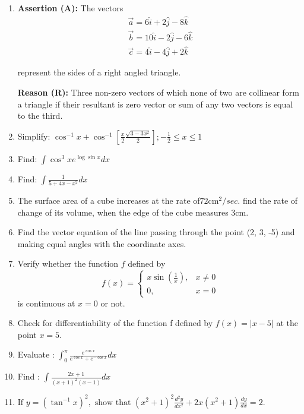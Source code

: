 \documentclass{article}
\providecommand{\brak}[1]{\ensuremath{\left(#1\right)}}
\begin{document}
\begin{enumerate}

\item \textbf{Assertion (A): } The vectors
	\begin{align*}
 \vec{a} = 6\hat{i}+2\hat{j}-8\hat{k}\\
 \vec{b} = 10\hat{i}-2\hat{j}-6\hat{k}\\
 \vec{c} = 4\hat{i}-4\hat{j}+2\hat{k}
	\end{align*}
 \centerline{represent the sides of a right angled triangle.}

 \textbf{Reason (R): } Three non-zero vectors of which none of two are collinear form a triangle if their resultant is zero vector or sum of any two vectors is equal to the third.

\item Simplify: $\cos^{-1}x + \cos^{-1}\left[\frac{x}{2}{\frac{\sqrt{3-3x^2}}{2}}\right];-\frac{1}{2} \leq x \leq 1$

\item Find: $\int \cos^3{x} e^{\log{\sin{x}}} dx $

\item Find: $\int \frac{1}{5+4x-x^2}dx$

\item The surface area of a cube increases at the rate of$72\mathrm{cm}^2/sec.$ find the rate of change of its volume, when the edge of the cube measures $3\mathrm{cm}.$

\item Find the vector equation of the line passing through the point (2, 3, -5) and making equal angles with the coordinate axes.

\item Verify whether the function $f$ defined by
	$$f\brak{x}= \begin{cases}
 x\sin\left(\frac{1}{x}\right), & x \neq 0 \\
 0, & x=0
 \end{cases}$$
 is continuous at $x=0$ or not.

\item Check for differentiability of the function f defined by $f(x) =|x-5|$ at the point $x=5$.

\item Evaluate : $\int_{0}^{\pi} \frac{e^{\cos{x}}}{e^{\cos{x}} + e^{-\cos{x}}} dx$
\\
\item Find : $\int \frac{2x+1}{(x+1)^2( x-1)} dx$

\item $\text{If } y = (\tan^{-1}x)^2, \text{ show that } (x^2+1)^2 \frac{d^2y}{dx^2} + 2x(x^2+1) \frac{dy}{dx} = 2.$


\end{enumerate}
\end{document}

